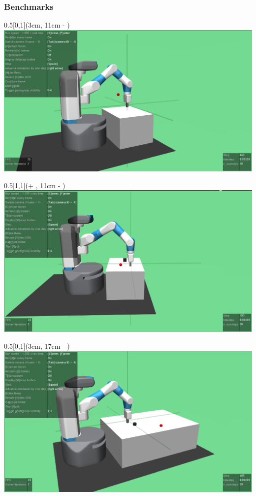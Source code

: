 \begin{frame}
	\frametitle{Benchmarks}	
	\vspace{1cm}

	
	\begin{textblock*}{0.5\paperwidth}[0,1](3cm, 11cm - \PraesentationSeitenrand)%
		\includegraphics[width=0.3\paperwidth]{./Ressourcen/Figures/FetchReach-v1.pdf}
	\end{textblock*}
	
	\begin{textblock*}{0.5\paperwidth}[1,1](\textwidth + \PraesentationSeitenrand, 11cm - \PraesentationSeitenrand)%
		\includegraphics[width=0.3\paperwidth]{./Ressourcen/Figures/FetchPush-v1.pdf}
	\end{textblock*}
	
	\begin{textblock*}{0.5\paperwidth}[0,1](3cm, 17cm - \PraesentationSeitenrand)%
		\includegraphics[width=0.3\paperwidth]{./Ressourcen/Figures/FetchSlide-v1.pdf}
	\end{textblock*}
	

\end{frame}
